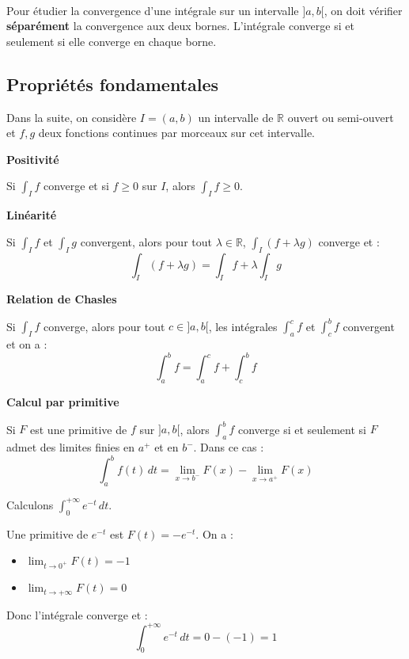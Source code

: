 \documentclass[../PolyS4.tex]{subfiles}
\begin{document}
\begin{Rmq}$\,$

Pour étudier la convergence d'une intégrale sur un intervalle $]a, b[$, on doit vérifier \textbf{séparément} la convergence aux deux bornes. L'intégrale converge si et seulement si elle converge en chaque borne.
\end{Rmq}

\subsection{Propriétés fondamentales}

Dans la suite, on considère $I = (a, b)$ un intervalle de $\mathbb{R}$ ouvert ou semi-ouvert et $f, g$ deux fonctions continues par morceaux sur cet intervalle.

\begin{Prop}
\textbf{Positivité}

Si $\displaystyle\int_{I} f$ converge et si $f \geq 0$ sur $I$, alors $\displaystyle\int_{I} f \geq 0$.
\end{Prop}

\begin{Prop}
\textbf{Linéarité}

Si $\displaystyle\int_{I} f$ et $\displaystyle\int_{I} g$ convergent, alors pour tout $\lambda \in \mathbb{R}$, $\displaystyle\int_{I}(f + \lambda g)$ converge et :
$$\int_{I}(f + \lambda g) = \int_{I} f + \lambda \int_{I} g$$
\end{Prop}

\begin{Prop}
\textbf{Relation de Chasles}

Si $\displaystyle\int_{I} f$ converge, alors pour tout $c \in ]a, b[$, les intégrales $\displaystyle\int_{a}^{c} f$ et $\displaystyle\int_{c}^{b} f$ convergent et on a :
$$\int_{a}^{b} f = \int_{a}^{c} f + \int_{c}^{b} f$$
\end{Prop}

\begin{Thm}
\textbf{Calcul par primitive}

Si $F$ est une primitive de $f$ sur $]a, b[$, alors $\displaystyle\int_{a}^{b} f$ converge si et seulement si $F$ admet des limites finies en $a^{+}$ et en $b^{-}$. Dans ce cas :
$$\int_{a}^{b} f(t) \, dt = \lim_{x \rightarrow b^{-}} F(x) - \lim_{x \rightarrow a^{+}} F(x)$$
\end{Thm}

\begin{Ex}
Calculons $\displaystyle\int_{0}^{+\infty} e^{-t} \, dt$.

Une primitive de $e^{-t}$ est $F(t) = -e^{-t}$. On a :
\begin{itemize}
\item $\displaystyle\lim_{t \to 0^{+}} F(t) = -1$
\item $\displaystyle\lim_{t \to +\infty} F(t) = 0$
\end{itemize}

Donc l'intégrale converge et :
$$\int_{0}^{+\infty} e^{-t} \, dt = 0 - (-1) = 1$$
\end{Ex}
\end{document}
